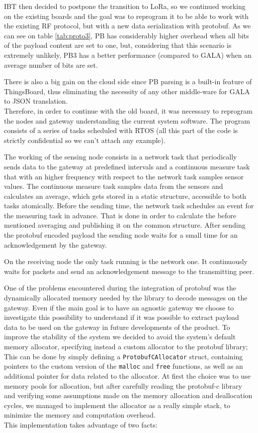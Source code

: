 \documentclass[10pt,a4]{article}
\begin{document}
IBT then decided to postpone the transition to LoRa, so we continued working on the existing boards and the goal was to reprogram it to be able to work with the existing RF protocol, but with a new data serialization with protobuf. As we can see on table \ref{tab:proto3}, PB has considerably higher overhead when all bits of the payload content are set to one, but, considering that this scenario is extremely unlikely, PB3 has a better performance (compared to GALA) when an average number of bits are set.

There is also a big gain on the cloud side since PB parsing is a built-in feature of ThingsBoard, thus eliminating the necessity of any other middle-ware for GALA to JSON translation.\\

Therefore, in order to continue with the old board, it was necessary to reprogram the nodes and gateway  understanding the current system software. The program consists of a series of tasks scheduled with RTOS (all this part of the code is strictly confidential so we can't attach any example).

The working of the sensing node consists in a network task that periodically sends data to the gateway at predefined intervals and a continuous measure task that with an higher frequency with respect to the network task samples sensor values. The continuous measure task samples data from the sensors and calculates an average, which gets stored in a static structure, accessible to both tasks atomically. Before the sending time, the network task schedules an event for the measuring task in advance. That is done in order to calculate the before mentioned averaging and publishing it on the common structure. After sending the protobuf encoded payload the sending node waits for a small time for an acknowledgement by the gateway.

On the receiving node the only task running is the network one. It continuously waits for packets and send an acknowledgement message to the transmitting peer.

One of the problems encountered during the integration of protobuf was the dynamically allocated memory needed by the library to decode messages on the gateway. Even if the main goal is to have an agnostic gateway we choose to investigate this possibility to understand if it was possible to extract payload data to be used on the gateway in future developments of the product.
To improve the stability of the system we decided to avoid the system's default memory allocator, specifying instead a custom allocator to the protobuf library; This can be done by simply defining a \texttt{ProtobufCAllocator} struct, containing pointers to the custom version of the \texttt{malloc} and \texttt{free} functions, as well as an additional pointer for data related to the allocator.
At first the choice was to use memory pools for allocation, but after carefully reading the protobuf-c library and verifying some assumptions made on the memory allocation and deallocation cycles, we managed to implement the allocator as a really simple stack, to minimize the memory and computation overhead.\\
This implementation takes advantage of two facts:
\end{document}
